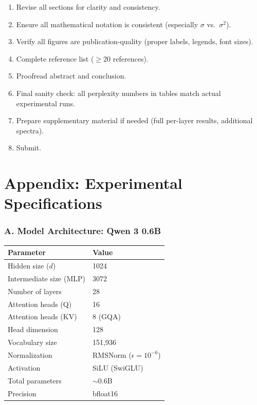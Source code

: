 \documentclass[11pt,a4paper]{article}
\begin{document}
\begin{enumerate}
    \item Revise all sections for clarity and consistency.
    \item Ensure all mathematical notation is consistent (especially $\sigma$ vs.\ $\sigma^2$).
    \item Verify all figures are publication-quality (proper labels, legends, font sizes).
    \item Complete reference list ($\geq$20 references).
    \item Proofread abstract and conclusion.
    \item Final sanity check: all perplexity numbers in tables match actual experimental runs.
    \item Prepare supplementary material if needed (full per-layer results, additional spectra).
    \item Submit.
\end{enumerate}

\newpage
\part*{Appendix: Experimental Specifications}

\section*{A. Model Architecture: Qwen 3 0.6B}

\begin{center}
\begin{tabular}{@{}ll@{}}
\toprule
\textbf{Parameter} & \textbf{Value} \\
\midrule
Hidden size ($d$) & 1024 \\
Intermediate size (MLP) & 3072 \\
Number of layers & 28 \\
Attention heads (Q) & 16 \\
Attention heads (KV) & 8 (GQA) \\
Head dimension & 128 \\
Vocabulary size & 151,936 \\
Normalization & RMSNorm ($\epsilon = 10^{-6}$) \\
Activation & SiLU (SwiGLU) \\
Total parameters & $\sim$0.6B \\
Precision & bfloat16 \\
\bottomrule
\end{tabular}
\end{center}
\end{document}
